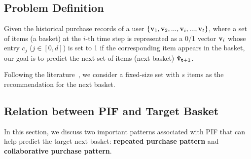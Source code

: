 \documentclass[sigconf]{acmart}
\begin{document}
\subsection{Problem Definition} 

Given the historical  purchase records of a user $\small\{\mathbf{v}_{1}, \mathbf{v}_{2}, ..., \mathbf{v}_{i}, ...,  \mathbf{v}_{t}\}$, where a  set of items (a basket) at the $i$-th time step is represented as a 0/1 vector $\small\mathbf{v}_{i}$ whose entry $c_j$ ($j\in[0,d]$) is set to 1 if the  corresponding item  appears in the  basket, our  goal is to predict the next set of items (next basket)  $\small\mathbf{\hat{v}_{t+1}}$. 

Following the  literature~\cite{rendle2010factorizing}\cite{yu2016dynamic}, we consider a  fixed-size set with $s$ items as the  recommendation for the next basket.




\subsection{Relation between PIF and Target Basket}
\label{sec:analysis_freq}

In this section, we discuss two important patterns  associated with PIF that can help predict the  target next basket: \textbf{repeated purchase pattern} and \textbf{collaborative purchase pattern}. 
\end{document}
